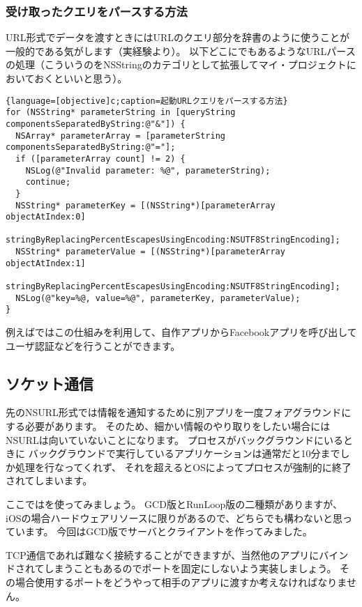 \subsubsection{受け取ったクエリをパースする方法}
URL形式でデータを渡すときにはURLのクエリ部分を辞書のように使うことが一般的である気がします（実経験より）。
以下どこにでもあるようなURLパースの処理（こういうのをNSStringのカテゴリとして拡張してマイ・プロジェクトにおいておくといいと思う）。
\begin{lstlisting}{language=[objective]c;caption=起動URLクエリをパースする方法}
for (NSString* parameterString in [queryString componentsSeparatedByString:@"&"]) {
  NSArray* parameterArray = [parameterString componentsSeparatedByString:@"="];
  if ([parameterArray count] != 2) {
	NSLog(@"Invalid parameter: %@", parameterString);
	continue;
  }
  NSString* parameterKey = [(NSString*)[parameterArray objectAtIndex:0]
	stringByReplacingPercentEscapesUsingEncoding:NSUTF8StringEncoding];
  NSString* parameterValue = [(NSString*)[parameterArray objectAtIndex:1]
	stringByReplacingPercentEscapesUsingEncoding:NSUTF8StringEncoding];
  NSLog(@"key=%@, value=%@", parameterKey, parameterValue);
}
\end{lstlisting}
例えばではこの仕組みを利用して、自作アプリからFacebookアプリを呼び出してユーザ認証などを行うことができます。

\subsection{ソケット通信}
先のNSURL形式では情報を通知するために別アプリを一度フォアグラウンドにする必要があります。
そのため、細かい情報のやり取りをしたい場合にはNSURLは向いていないことになります。
プロセスがバックグラウンドにいるときに
バックグラウンドで実行しているアプリケーションは通常だと10分までしか処理を行なってくれず、
それを超えるとOSによってプロセスが強制的に終了されてしまいます。

ここではを使ってみましょう。
GCD版とRunLoop版の二種類がありますが、iOSの場合ハードウェアリソースに限りがあるので、どちらでも構わないと思っています。
今回はGCD版でサーバとクライアントを作ってみました。

TCP通信であれば難なく接続することができますが、当然他のアプリにバインドされてしまうこともあるのでポートを固定にしないよう実装しましょう。
その場合使用するポートをどうやって相手のアプリに渡すか考えなければなりません。

